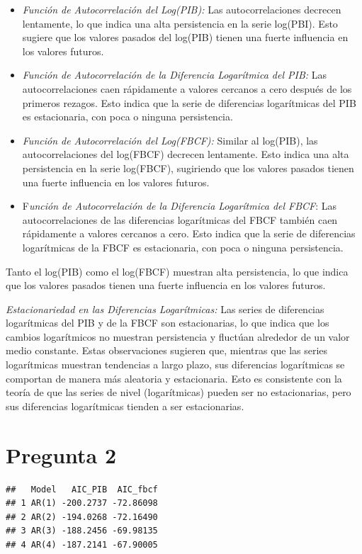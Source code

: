\documentclass[
  12pt,
]{article}
\begin{document}
\begin{itemize}
\item
  \emph{Función de Autocorrelación del Log(PIB):} Las autocorrelaciones
  decrecen lentamente, lo que indica una alta persistencia en la serie
  log(PBI). Esto sugiere que los valores pasados del log(PIB) tienen una
  fuerte influencia en los valores futuros.
\item
  \emph{Función de Autocorrelación de la Diferencia Logarítmica del
  PIB:} Las autocorrelaciones caen rápidamente a valores cercanos a cero
  después de los primeros rezagos. Esto indica que la serie de
  diferencias logarítmicas del PIB es estacionaria, con poca o ninguna
  persistencia.
\item
  \emph{Función de Autocorrelación del Log(FBCF):} Similar al log(PIB),
  las autocorrelaciones del log(FBCF) decrecen lentamente. Esto indica
  una alta persistencia en la serie log(FBCF), sugiriendo que los
  valores pasados tienen una fuerte influencia en los valores futuros.
\item
  F\emph{unción de Autocorrelación de la Diferencia Logarítmica del
  FBCF}: Las autocorrelaciones de las diferencias logarítmicas del FBCF
  también caen rápidamente a valores cercanos a cero. Esto indica que la
  serie de diferencias logarítmicas de la FBCF es estacionaria, con poca
  o ninguna persistencia.
\end{itemize}

Tanto el log(PIB) como el log(FBCF) muestran alta persistencia, lo que
indica que los valores pasados tienen una fuerte influencia en los
valores futuros.

\emph{Estacionariedad en las Diferencias Logarítmicas:} Las series de
diferencias logarítmicas del PIB y de la FBCF son estacionarias, lo que
indica que los cambios logarítmicos no muestran persistencia y fluctúan
alrededor de un valor medio constante. Estas observaciones sugieren que,
mientras que las series logarítmicas muestran tendencias a largo plazo,
sus diferencias logarítmicas se comportan de manera más aleatoria y
estacionaria. Esto es consistente con la teoría de que las series de
nivel (logarítmicas) pueden ser no estacionarias, pero sus diferencias
logarítmicas tienden a ser estacionarias.

\section{Pregunta 2}\label{pregunta-2}

\begin{verbatim}
##   Model   AIC_PIB  AIC_fbcf
## 1 AR(1) -200.2737 -72.86098
## 2 AR(2) -194.0268 -72.16490
## 3 AR(3) -188.2456 -69.98135
## 4 AR(4) -187.2141 -67.90005
\end{verbatim}
\end{document}
